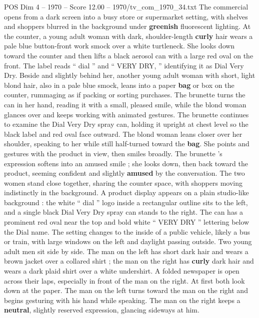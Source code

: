 \begin{textsample}{POS Dim 4 – 1970 – Score 12.00 – 1970/tv\_com\_1970\_34.txt}  \label{ex:f4_pos_090}
The commercial opens from a dark screen into a busy store or supermarket setting, with shelves and shoppers blurred in the background under \textbf{greenish} fluorescent lighting.
At the counter, a young adult woman with dark, shoulder-length \textbf{curly} hair wears a pale blue button-front work smock over a white turtleneck.
She looks down toward the counter and then lifts a black aerosol can with a large red oval on the front.
The label reads “ dial ” and “ VERY DRY, ” identifying it as Dial Very Dry.
Beside and slightly behind her, another young adult woman with short, light blond hair, also in a pale blue smock, leans into a paper \textbf{bag} or box on the counter, rummaging as if packing or sorting purchases.
The brunette turns the can in her hand, reading it with a small, pleased smile, while the blond woman glances over and keeps working with animated gestures.
The brunette continues to examine the Dial Very Dry spray can, holding it upright at chest level so the black label and red oval face outward.
The blond woman leans closer over her shoulder, speaking to her while still half-turned toward the \textbf{bag}.
She points and gestures with the product in view, then smiles broadly.
The brunette ’s expression softens into an amused smile ; she looks down, then back toward the product, seeming confident and slightly \textbf{amused} by the conversation.
The two women stand close together, sharing the counter space, with shoppers moving indistinctly in the background.
A product display appears on a plain studio-like background : the white “ dial ” logo inside a rectangular outline sits to the left, and a single black Dial Very Dry spray can stands to the right.
The can has a prominent red oval near the top and bold white “ VERY DRY ” lettering below the Dial name.
The setting changes to the inside of a public vehicle, likely a bus or train, with large windows on the left and daylight passing outside.
Two young adult men sit side by side.
The man on the left has short dark hair and wears a brown jacket over a collared shirt ; the man on the right has \textbf{curly} dark hair and wears a dark plaid shirt over a white undershirt.
A folded newspaper is open across their laps, especially in front of the man on the right.
At first both look down at the paper.
The man on the left turns toward the man on the right and begins gesturing with his hand while speaking.
The man on the right keeps a \textbf{neutral}, slightly reserved expression, glancing sideways at him.

\end{textsample}
